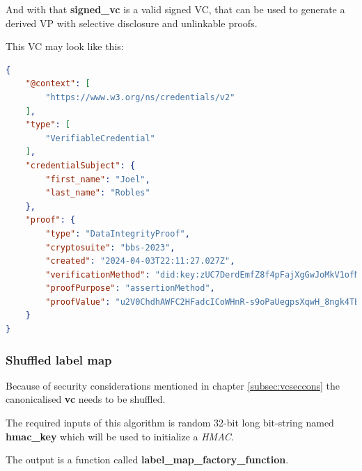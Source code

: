 \documentclass[
	a4paper               %
	,bibliography=totoc   %
	,listof=totoc         %
	,monolingual
	twoside=false,
]{bfhthesis}              %
\begin{document}
And with that \textbf{signed\_vc} is a valid signed VC, that can be used to generate a derived VP with selective disclosure and unlinkable proofs.

This VC may look like this:

\begin{lstlisting}[language=json,firstnumber=1,caption={Signed VC},captionpos=b]
{
	"@context": [
		"https://www.w3.org/ns/credentials/v2"
	],
	"type": [
		"VerifiableCredential"
	],
	"credentialSubject": {
		"first_name": "Joel",
		"last_name": "Robles"
	},
	"proof": {
		"type": "DataIntegrityProof",
		"cryptosuite": "bbs-2023",
		"created": "2024-04-03T22:11:27.027Z",
		"verificationMethod": "did:key:zUC7DerdEmfZ8f4pFajXgGwJoMkV1ofMTmEG5UoNvnWiPiLuGKNeqgRpLH2TV4Xe5mJ2cXV76gRN7LFQwapF1VFu6x2yrr5ci1mXqC1WNUrnHnLgvfZfMH7h6xP6qsf9EKRQrPQ#zUC7DerdEmfZ8f4pFajXgGwJoMkV1ofMTmEG5UoNvnWiPiLuGKNeqgRpLH2TV4Xe5mJ2cXV76gRN7LFQwapF1VFu6x2yrr5ci1mXqC1WNUrnHnLgvfZfMH7h6xP6qsf9EKRQrPQ",
		"proofPurpose": "assertionMethod",
		"proofValue": "u2V0ChdhAWFC2HFadcICoWHnR-s9oPaUegpsXqwH_8ngk4TBuMLDFqnvVCo9axh2gcmb2w4KJ5LlfQOgl6M_YY3waJwFPMF5oqtZGI0rzf6HfWOS6VfGPWthAWEClRFA4ut1V3aj4gUvaZAvy2PvZHn-CFZzt5TUfXODzG0MDCe45ZPrMkpKH4UaaxIUqC6L_lhaGZLEMu5ae3gHb2EBYYKTvGvo9pXVJbxIrm3i4wkdhUxqKCTIGrnxFuAdZwWi6T3omD5wzZ7bAGbRneEEQSxBmXtvnC6Pr59nPv_v3HrAW9wq_uxYzF_NyaX3GPv0h_FV2T2OSao8C6uoyWiqIj9hAWCAAESIzRFVmd4iZqrvM3e7_ABEiM0RVZneImaq7zN3u_4F4HS9jcmVkZW50aWFsU3ViamVjdC9maXJzdF9uYW1l"
	}
}
\end{lstlisting}

\subsubsection{Shuffled label map}
\label{sub:shuffledlabelmap}

Because of security considerations mentioned in chapter \ref{subsec:vcseccons} the canonicalised \textbf{vc} needs to be shuffled.

The required inputs of this algorithm is random 32-bit long bit-string named \textbf{hmac\_key} which will be used to initialize a \textit{HMAC}.

The output is a function called \textbf{label\_map\_factory\_function}.

\end{document}
